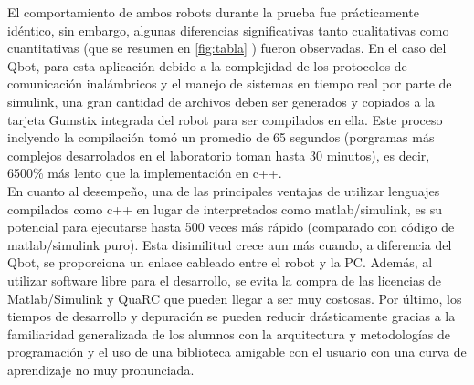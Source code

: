 \documentclass[letterpaper,openright,12pt]{book}
\begin{document}
El comportamiento de ambos robots durante la prueba fue prácticamente idéntico, sin embargo, algunas diferencias significativas tanto cualitativas como cuantitativas (que se resumen en \ref{fig:tabla} ) fueron observadas. En el caso del Qbot, para esta aplicación debido a la complejidad de los protocolos de comunicación inalámbricos y el manejo de sistemas en tiempo real por parte de simulink, una gran cantidad de archivos deben ser generados y copiados a la tarjeta Gumstix integrada del robot para ser compilados en ella. Este proceso inclyendo la compilación tomó un promedio de 65 segundos (porgramas más complejos desarrolados en el laboratorio toman hasta 30 minutos), es decir, 6500\% más lento que la implementación en c++.\\
En cuanto al desempeño, una de las principales ventajas de utilizar lenguajes compilados como c++ en lugar de interpretados como matlab/simulink, es su potencial para ejecutarse hasta 500 veces más rápido (comparado con código de matlab/simulink puro)\cite{andrews}. Esta disimilitud crece aun más cuando, a diferencia del Qbot, se proporciona un enlace cableado entre el robot y la PC. Además, al utilizar software libre para el desarrollo, se evita la compra de las licencias de Matlab/Simulink y QuaRC que pueden llegar a ser muy costosas. Por último, los tiempos de desarrollo y depuración se pueden reducir drásticamente gracias a la familiaridad generalizada de los alumnos con la arquitectura y metodologías de programación y el uso de una biblioteca amigable con el usuario con una curva de aprendizaje no muy pronunciada.\\
\end{document}

